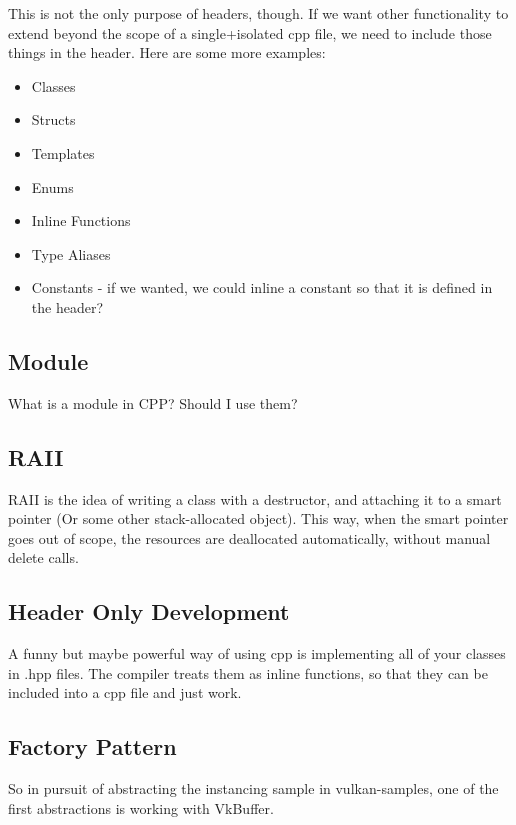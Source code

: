 \documentclass{article}
\begin{document}
\par This is not the only purpose of headers, though. If we want
other functionality to extend beyond the scope of a single+isolated
cpp file, we need to include those things in the header. Here are
some more examples:

\begin{itemize}
\item Classes
\item Structs
\item Templates
\item Enums
\item Inline Functions
\item Type Aliases
\item Constants - if we wanted, we could inline a constant so that it
  is defined in the header?
\end{itemize}

\subsection*{Module}
\par What is a module in CPP? Should I use them?

\subsection*{RAII}
\par RAII is the idea of writing a class with a destructor, and
attaching it to a smart pointer (Or some other stack-allocated
object). This way, when the smart pointer goes out of scope, the
resources are deallocated automatically, without manual delete calls.

\subsection*{Header Only
Development}
\par A funny but maybe powerful way of using cpp is implementing all
of your classes in .hpp files. The compiler treats them as inline
functions, so that they can be included into a cpp file and just work.

\subsection*{Factory Pattern}
\par So in pursuit of abstracting the instancing sample in
vulkan-samples, one of the first abstractions is working with VkBuffer.
\end{document}
